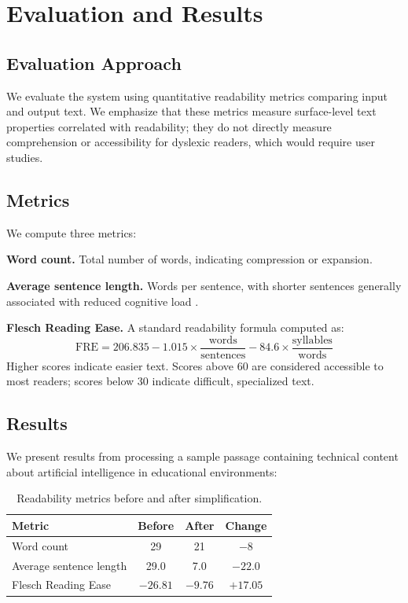 \documentclass[11pt]{article}
\begin{document}
\section{Evaluation and Results}

\subsection{Evaluation Approach}

We evaluate the system using quantitative readability metrics comparing input and output text. We emphasize that these metrics measure surface-level text properties correlated with readability; they do not directly measure comprehension or accessibility for dyslexic readers, which would require user studies.

\subsection{Metrics}

We compute three metrics:

\textbf{Word count.} Total number of words, indicating compression or expansion.

\textbf{Average sentence length.} Words per sentence, with shorter sentences generally associated with reduced cognitive load \citep{siddharthan2014}.

\textbf{Flesch Reading Ease.} A standard readability formula computed as:
\begin{equation}
\text{FRE} = 206.835 - 1.015 \times \frac{\text{words}}{\text{sentences}} - 84.6 \times \frac{\text{syllables}}{\text{words}}
\end{equation}
Higher scores indicate easier text. Scores above 60 are considered accessible to most readers; scores below 30 indicate difficult, specialized text.

\subsection{Results}

We present results from processing a sample passage containing technical content about artificial intelligence in educational environments:

\begin{table}[h]
\centering
\begin{tabular}{lccc}
\toprule
Metric & Before & After & Change \\
\midrule
Word count & 29 & 21 & $-8$ \\
Average sentence length & 29.0 & 7.0 & $-22.0$ \\
Flesch Reading Ease & $-26.81$ & $-9.76$ & $+17.05$ \\
\bottomrule
\end{tabular}
\caption{Readability metrics before and after simplification.}
\label{tab:results}
\end{table}
\end{document}

